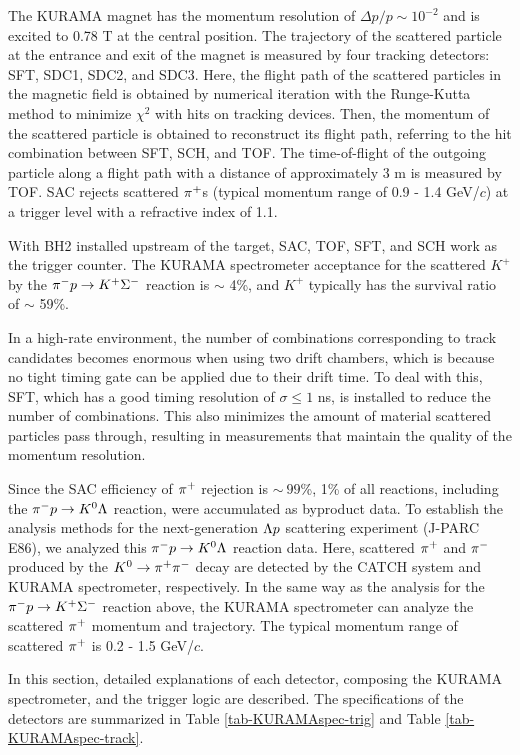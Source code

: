 The KURAMA magnet has the momentum resolution of $\Delta p/p \sim10^{-2}$ \cite{Miwa-SMp} and is excited to 0.78 T at the central position. The trajectory of the scattered particle at the entrance and exit of the magnet is measured by four tracking detectors: SFT, SDC1, SDC2, and SDC3. Here, the flight path of the scattered particles in the magnetic field is obtained by numerical iteration with the Runge-Kutta method \cite{Runge} to minimize $\chi^2$ with hits on tracking devices. Then, the momentum of the scattered particle is obtained to reconstruct its flight path, referring to the hit combination between SFT, SCH, and TOF. The time-of-flight of the outgoing particle along a flight path with a distance of approximately 3 m is measured by TOF. SAC rejects scattered $\pi^{+}$s (typical momentum range of 0.9 - 1.4 GeV/$c$) at a trigger level with a refractive index of 1.1.%

With BH2 installed upstream of the target, SAC, TOF, SFT, and SCH work as the trigger counter. The KURAMA spectrometer acceptance for the scattered $K^+$ by the $\pi^- p \to K^+ \Sigma^-$ reaction is $\sim$ 4\%, and $K^+$ typically has the survival ratio of $\sim$ 59\%. 
  
In a high-rate environment, the number of combinations corresponding to track candidates becomes enormous when using two drift chambers, which is because no tight timing gate can be applied due to their drift
time. To deal with this, SFT, which has a good timing resolution of $\sigma \leq 1$ ns, is installed to reduce the number of combinations. This also minimizes the amount of material scattered particles pass through, resulting in measurements that maintain the quality of the momentum resolution.

Since the SAC efficiency of $\pi^{+}$ rejection is $\sim\ 99$\%, 1\% of all reactions, including the $\pi^- p \to K^0 \Lambda$ reaction, were accumulated as byproduct data. To establish the analysis methods for the next-generation $\Lambda p$ scattering experiment (J-PARC E86), we analyzed this $\pi^- p \to K^0 \Lambda$ reaction data. Here, scattered $\pi^{+}$ and $\pi^{-}$ produced by the $K^0 \to \pi^+ \pi^-$ decay are detected by the CATCH system and KURAMA spectrometer, respectively. In the same way as the analysis for the $\pi^- p \to K^+ \Sigma^-$ reaction above, the KURAMA spectrometer can analyze the scattered $\pi^{+}$ momentum and trajectory. The typical momentum range of scattered $\pi^{+}$ is 0.2 - 1.5 GeV/$c$.

In this section, detailed explanations of each detector, composing the KURAMA spectrometer, and the trigger logic are described. The specifications of the detectors are summarized in Table \ref{tab-KURAMAspec-trig} and Table \ref{tab-KURAMAspec-track}.

